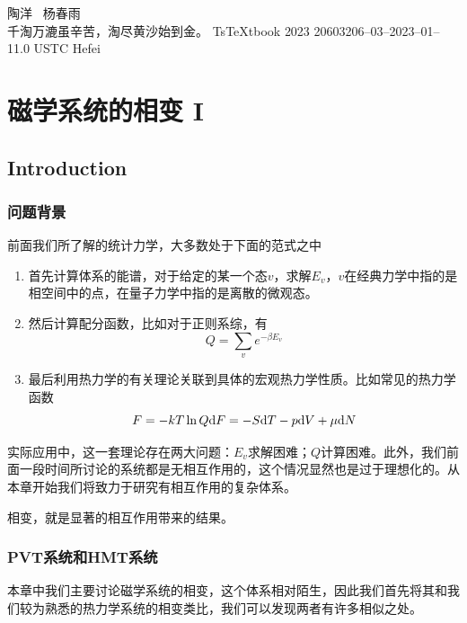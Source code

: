 \documentclass[AutoFakeBold]{tstextbook}
\begin{document}
{\large \kaishu 陶洋 \ 杨春雨\\
    千淘万漉虽辛苦，淘尽黄沙始到金。}
{Ts\TeX tbook}
{2023}
{20603}{206--03--2023--01--1}{1.0}
{USTC}
{Hefei}





\chapter{磁学系统的相变 I} %
\label{cha:磁学系统的相变 I}
\section{Introduction} %
\label{sec:Introduction}
\subsection{问题背景} %
\label{sub:问题背景}
前面我们所了解的统计力学，大多数处于下面的范式之中

\begin{enumerate}\setlength{\itemsep}{0pt}
    \item 首先计算体系的能谱，对于给定的某一个态$v$，求解$E_v$，$v$在经典力学中指的是相空间中的点，在量子力学中指的是离散的微观态。
    \item 然后计算配分函数，比如对于正则系综，有\begin{equation}
              Q=\sum_{v}e^{-\beta E_v}
          \end{equation}
    \item 最后利用热力学的有关理论关联到具体的宏观热力学性质。比如常见的热力学函数\begin{equation}
        F=-kT\ln Q\\
        \mathrm{d} F = -S\mathrm{d} T -p\mathrm{d} V +\mu \mathrm{d} N
    \end{equation}
\end{enumerate}

实际应用中，这一套理论存在两大问题：$E_v$求解困难；$Q$计算困难。此外，我们前面一段时间所讨论的系统都是无相互作用的，这个情况显然也是过于理想化的。从本章开始我们将致力于研究有相互作用的复杂体系。

相变，就是显著的相互作用带来的结果。

\subsection{PVT系统和HMT系统} %
\label{sub:PVT系统和HMT系统}
本章中我们主要讨论磁学系统的相变，这个体系相对陌生，因此我们首先将其和我们较为熟悉的热力学系统的相变类比，我们可以发现两者有许多相似之处。
\end{document}

